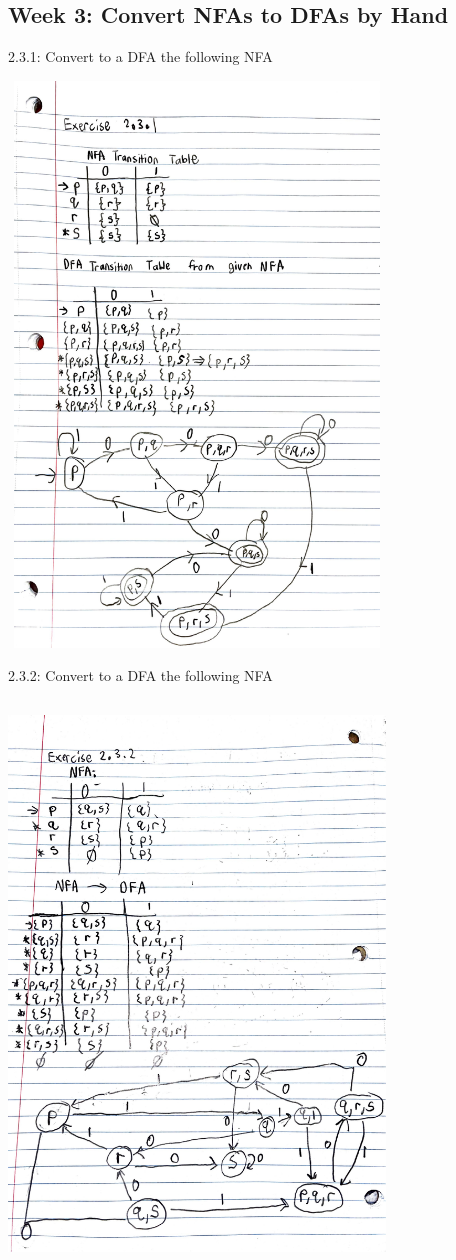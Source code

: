 \documentclass{article}
\theoremstyle{theorem}
\theoremstyle{definition}
\theoremstyle{remark}
\begin{document}
\subsection{Week 3: Convert NFAs to DFAs by Hand}
2.3.1: Convert to a DFA the following NFA
\medskip\begin{center}
\includegraphics[width=10cm, height=15cm]{Week3_2.3.1.pdf}
\end{center}
2.3.2: Convert to a DFA the following NFA
\medskip\begin{center}
\includegraphics[width=10cm, height=15cm]{Week3_2.3.2.pdf}
\end{center}
\end{document}
